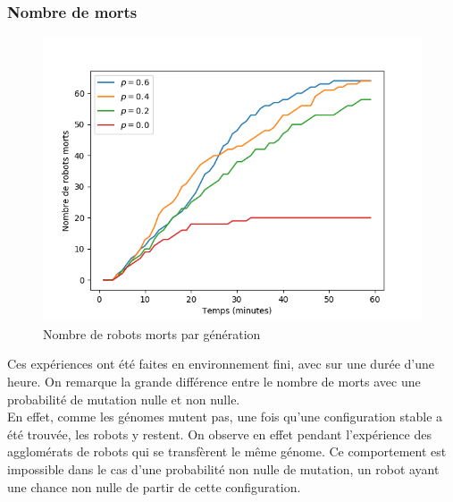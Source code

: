 \documentclass[a4paper]{article}
\begin{document}
\subsubsection{Nombre de morts}
\begin{figure}[h]
	\centering
	\begin{minipage}[c]{.46\linewidth}
		\centering
		\includegraphics[width=1.1\linewidth]{../../script_results/mEDEA_1_with_0.png}
		\caption{Nombre de robots morts par génération}
	\end{minipage}
\end{figure}
Ces expériences ont été faites en environnement fini, avec sur une durée d'une heure. On remarque la grande différence entre le nombre de morts avec une probabilité de mutation nulle et non nulle.\\
En effet, comme les génomes mutent pas, une fois qu'une configuration stable a été trouvée, les robots y restent. On observe en effet pendant l'expérience des agglomérats de robots qui se transfèrent le même génome. Ce comportement est impossible dans le cas d'une probabilité non nulle de mutation, un robot ayant une chance non nulle de partir de cette configuration.
\end{document}
